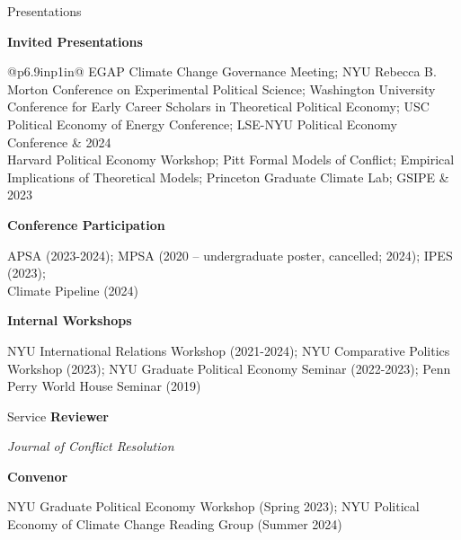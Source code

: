 \documentclass{resume} %
\begin{document}
\begin{rSection}{Presentations}

\textbf{Invited Presentations}

\begin{table}[!htbp]
    \centering
    \begin{tabular}{@{\hspace*{2em}}p{6.9in}p{1in}@}
    EGAP Climate Change Governance Meeting; NYU  Rebecca B. Morton Conference on Experimental Political Science;  Washington University Conference for Early Career Scholars in Theoretical Political Economy; USC Political Economy of Energy Conference; LSE-NYU Political Economy Conference & 2024\\
      Harvard Political Economy Workshop; Pitt Formal Models of Conflict; Empirical Implications of Theoretical Models; Princeton Graduate Climate Lab; GSIPE    & 2023 
    \end{tabular}
\end{table}
\textbf{Conference Participation}

\hspace*{0.5em} APSA (2023-2024);  MPSA (2020 -- undergraduate poster, cancelled; 2024); IPES (2023); \\ Climate Pipeline (2024)

\textbf{Internal Workshops}

\hspace*{0.5em} NYU International Relations Workshop (2021-2024); NYU Comparative Politics Workshop (2023); NYU Graduate Political Economy Seminar (2022-2023); Penn Perry World House Seminar (2019)
\end{rSection}

\begin{rSection}{Service}
    \textbf{Reviewer}

    \hspace*{0.5em} \textit{Journal of Conflict Resolution}

    \textbf{Convenor}

    \hspace*{0.5em} NYU Graduate Political Economy Workshop (Spring 2023); NYU Political Economy of Climate Change Reading Group (Summer 2024)
    
\end{rSection}
\end{document}
